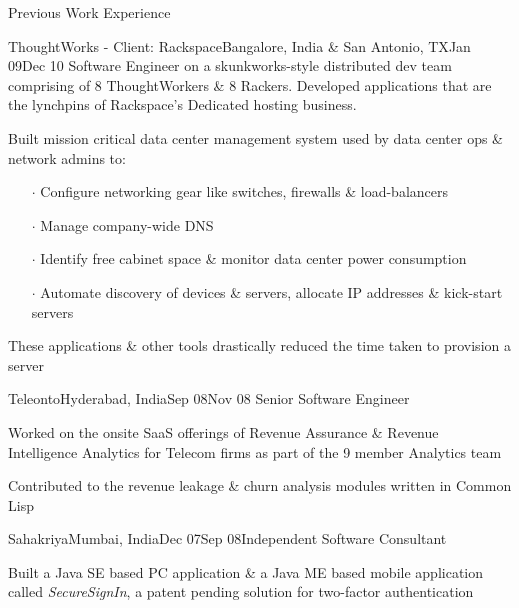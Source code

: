 \documentclass{resume} %
\begin{document}
\begin{rSection}{Previous Work Experience}

\begin{rSubsection}{ThoughtWorks - Client: Rackspace}{Bangalore, India \& San Antonio,
  TX}{Jan 09}{Dec
    10}
{Software Engineer on a skunkworks-style distributed dev team comprising of 8
  ThoughtWorkers \& 8 Rackers. Developed applications that are the
  lynchpins of Rackspace's Dedicated hosting business.}

\item Built mission critical data center management system used by
  data center ops \& network admins to:
\vspace{-0.5em}
\begin{itemize}  \itemsep0.5pt \parskip0pt
    \item[$\cdot$] Configure networking gear like switches, firewalls \& load-balancers
    \item[$\cdot$] Manage company-wide DNS
    \item[$\cdot$] Identify free cabinet space \& monitor data center power consumption
    \item[$\cdot$] Automate discovery of devices \& servers, allocate IP addresses \& kick-start servers
\end{itemize}
\item These applications \& other tools drastically reduced the time taken to provision a server
\end{rSubsection}


\begin{rSubsection}{Teleonto}{Hyderabad, India}{Sep 08}{Nov 08}
{Senior Software Engineer}
\item Worked on the onsite SaaS offerings of Revenue Assurance \& Revenue Intelligence Analytics for Telecom firms as part of the 9 member Analytics team
\item Contributed to the revenue leakage \& churn analysis modules written in Common Lisp
\end{rSubsection}


\begin{rSubsection}{Sahakriya}{Mumbai, India}{Dec 07}{Sep 08}{Independent Software Consultant}
\item Built a Java SE based PC application \& a Java ME based mobile application called {\em SecureSignIn}, a patent pending solution for two-factor authentication 


\end{rSubsection}
\end{rSection}
\end{document}
